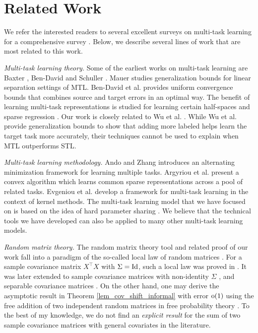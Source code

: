 \vspace{-0.05in}
\section{Related Work}
\vspace{-0.05in}

We refer the interested readers to several excellent surveys on multi-task  learning for a comprehensive survey \cite{PY09,R17,ZY17,V20}.
Below, we describe several lines of work that are most related to this work.

\textit{Multi-task learning theory.}
Some of the earliest works on multi-task learning are Baxter \cite{B00}, Ben-David and Schuller \cite{BS03}.
Mauer \cite{M06} studies generalization bounds for linear separation settings of MTL.
Ben-David et al. \cite{BBCK10} provides uniform convergence bounds that combines source and target errors in an optimal way.
The benefit of learning multi-task representations is studied for learning certain half-spaces \cite{MPR16} and sparse regression \cite{LPTV09,LPVT11}.
Our work is closely related to Wu et al. \cite{WZR20}.
While Wu et al. provide generalization bounds to show that adding more labeled helps learn the target task more accurately, their techniques cannot be used to explain when MTL outperforms STL.

\textit{Multi-task learning methodology.}
Ando and Zhang \cite{AZ05} introduces an alternating minimization framework for learning multiple tasks.
Argyriou et al. \cite{AEP08} present a convex algorithm which learns common sparse representations across a pool of related tasks.
Evgeniou et al. \cite{EMP05} develop a framework for multi-task learning in the context of kernel methods.
The multi-task learning model that we have focused on is based on the idea of hard parameter sharing \cite{C93,KD12,R17}.
We believe that the technical tools we have developed can also be applied to many other multi-task learning models.

\textit{Random matrix theory.}
The random matrix theory tool and related proof of our work fall into a paradigm of the so-called local law of random matrices \cite{erdos2017dynamical}.
For a sample covariance matrix $X^\top X$ with $\Sigma=\operatorname{Id}$, such a local law was proved in \cite{isotropic}.
It was later extended to sample covariance matrices with non-identity $\Sigma$ \cite{Anisotropic}, and separable covariance matrices \cite{yang2019spiked}. On the other hand, one may derive the asymptotic result in Theorem \ref{lem_cov_shift_informal} with error $\operatorname{o}(1)$ using the free addition of two independent random matrices in free probability theory \cite{nica2006lectures}. To the best of my knowledge, we do not find an {\it explicit result} for the sum of two sample covariance matrices with general covariates in the literature.


